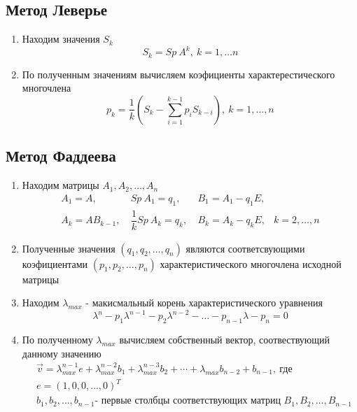 \documentclass[11.4pt]{article}
\begin{document}
	\subsection{Метод Леверье}
		\begin{enumerate}
			\item Находим значения $S_k$ \[S_k=Sp\:A^k, \: k = 1,\ldots n\]
			\item По полученным значениям вычисляем коэфициенты характерестического многочлена
				\[p_k = \dfrac{1}{k}\left( S_k - \sum\limits_{i=1}^{k-1}p_iS_{k-i} \right), \: k = 1,\ldots,n\]
		\end{enumerate}
	\subsection{Метод Фаддеева}
		\begin{enumerate}
			\item Находим матрицы $A_1, A_2, \ldots, A_n$
				\begin{equation*}
					\begin{array}{cccc}
						A_1 = A, & Sp\: A_1=q_1, \: & B_1=A_1-q_1E,\\
						A_k = AB_{k-1},\: & \dfrac{1}{k}Sp\:A_k=q_k, \: &B_k=A_k-q_kE, & k=2,\ldots,n
					\end{array}						
			\end{equation*}
			\item Полученные значения $(q_1, q_2,\ldots, q_n)$ являются соответсвующими коэфициентами $(p_1, p_2, \ldots, p_n)$ характеристического многочлена исходной матрицы
			\item Находим $\lambda_{max}$ - макисмальный корень характеристического уравнения \[\lambda^n - p_1\lambda^{n-1} - p_2\lambda^{n-2}-\ldots-p_{n-1}\lambda - p_n = 0\]
			\item По полученному $\lambda_{max}$ вычисляем собственный вектор, соотвествующий данному значению \[\]
			\begin{equation*}
					\begin{aligned}
					&\vec{v} = \lambda^{n-1}_{max}e + \lambda^{n-2}_{max}b_1 + \lambda^{n-3}_{max}b_2 + \cdots + \lambda_{max}b_{n-2} + b_{n-1}, \: \text{где}\\
					&e = (1, 0, 0, \ldots, 0)^T\\
					&b_1, b_2, \ldots, b_{n-1}\text{- первые столбцы соответствующих матриц } B_1, B_2, \ldots, B_{n-1}
					\end{aligned}
			\end{equation*}
		\end{enumerate}
\end{document}
